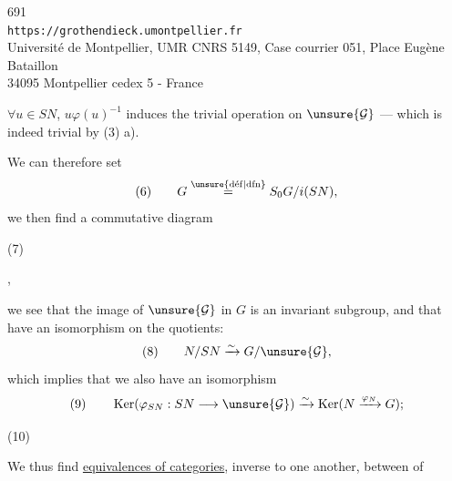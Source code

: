 
\begin{center}
691\\
\texttt{https://grothendieck.umontpellier.fr}\\
Université de Montpellier, UMR CNRS 5149, Case courrier 051, Place Eugène Bataillon\\
34095 Montpellier cedex 5 - France
\end{center}



$\forall u\in SN$, $u\varphi(u)^{-1}$ induces the trivial operation on $\unsure{\mathcal G}$ --- which is indeed trivial by (3) a).

We can therefore set
\[
(6)\qquad  G\overset{\unsure{\mathrm{d\acute ef}|\mathrm{dfn}}}{=}S_0G/i(SN),
\]
we then find a commutative diagram

\begin{samepage}
\noindent (7)\quad
{}
\end{samepage},

we see that the image of $\unsure{\mathcal G}$ in $G$ is an invariant subgroup, and that  have an isomorphism on the quotients:
\[
(8)\qquad  N/SN\xrightarrow{\sim}G/\unsure{\mathcal G},
\]
which implies that we also have an isomorphism
\[
(9)\qquad  \operatorname{Ker}(\varphi_{SN}:SN\longrightarrow\unsure{\mathcal G})
\xrightarrow{\sim}\operatorname{Ker}(N\xrightarrow{\varphi_N}G);
\]

\begin{samepage}
\noindent (10)\quad
{}
\end{samepage}

We thus find \uline{equivalences of categories}, inverse to one another, between  of

